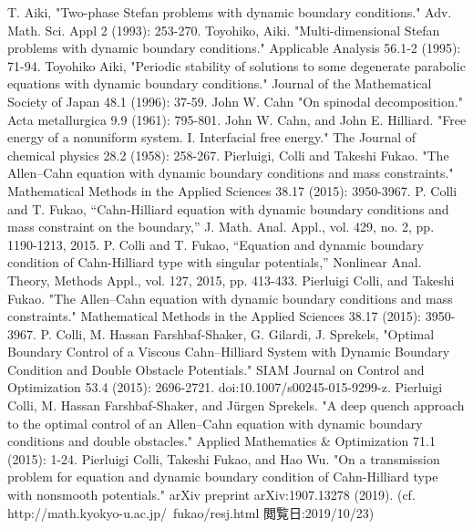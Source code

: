 \documentclass[a4paper]{jsarticle}
\begin{document}
\begin{thebibliography}{99}
		T. Aiki, "Two-phase Stefan problems with dynamic boundary conditions." Adv. Math. Sci. Appl 2 (1993): 253-270.
		Toyohiko, Aiki. "Multi-dimensional Stefan problems with dynamic boundary conditions." Applicable Analysis 56.1-2 (1995): 71-94.
		Toyohiko Aiki, "Periodic stability of solutions to some degenerate parabolic equations with dynamic boundary conditions." Journal of the Mathematical Society of Japan 48.1 (1996): 37-59.
		John W. Cahn "On spinodal decomposition." Acta metallurgica 9.9 (1961): 795-801.
		John W. Cahn, and John E. Hilliard. "Free energy of a nonuniform system. I. Interfacial free energy." The Journal of chemical physics 28.2 (1958): 258-267.
		Pierluigi, Colli and Takeshi Fukao. "The Allen–Cahn equation with dynamic boundary conditions and mass constraints." Mathematical Methods in the Applied Sciences 38.17 (2015): 3950-3967.
		P. Colli and T. Fukao, “Cahn-Hilliard equation with dynamic boundary conditions and mass constraint on the boundary,” J. Math. Anal. Appl., vol. 429, no. 2, pp. 1190-1213, 2015.
		P. Colli and T. Fukao, “Equation and dynamic boundary condition of Cahn-Hilliard type with singular potentials,” Nonlinear Anal. Theory, Methods Appl., vol. 127, 2015, pp. 413-433.
		Pierluigi Colli, and Takeshi Fukao. "The Allen–Cahn equation with dynamic boundary conditions and mass constraints." Mathematical Methods in the Applied Sciences 38.17 (2015): 3950-3967.
		P. Colli, M. Hassan Farshbaf-Shaker, G. Gilardi, J. Sprekels, "Optimal Boundary Control of a Viscous Cahn--Hilliard System with Dynamic Boundary Condition and Double Obstacle Potentials." SIAM Journal on Control and Optimization 53.4 (2015): 2696-2721. doi:10.1007/s00245-015-9299-z.
		Pierluigi Colli, M. Hassan Farshbaf-Shaker, and Jürgen Sprekels. "A deep quench approach to the optimal control of an Allen–Cahn equation with dynamic boundary conditions and double obstacles." Applied Mathematics \& Optimization 71.1 (2015): 1-24.
		Pierluigi Colli, Takeshi Fukao, and Hao Wu. "On a transmission problem for equation and dynamic boundary condition of Cahn-Hilliard type with nonsmooth potentials." arXiv preprint arXiv:1907.13278 (2019).
		(cf. http://math.kyokyo-u.ac.jp/~fukao/resj.html 閲覧日:2019/10/23)

\end{thebibliography}
\end{document}
